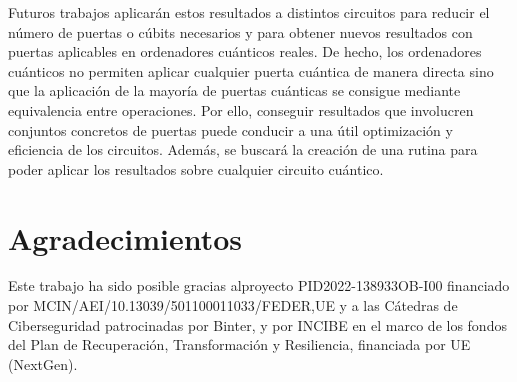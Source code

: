 \documentclass[10pt,conference,a4paper]{IEEEtran}
\begin{document}
Futuros trabajos  aplicarán estos resultados a distintos circuitos para reducir el número de puertas o cúbits necesarios y para obtener nuevos resultados con puertas aplicables en   ordenadores cuánticos reales. De hecho, los ordenadores cuánticos no permiten aplicar cualquier puerta cuántica de manera directa sino que la aplicación de la mayoría de puertas cuánticas se consigue mediante equivalencia entre operaciones. Por ello, conseguir resultados que involucren conjuntos concretos de puertas puede  conducir a una útil optimización y eficiencia de los circuitos. Además, se buscará la creación de una rutina para poder aplicar los resultados sobre cualquier circuito cuántico.

\section*{Agradecimientos}

Este trabajo ha sido posible gracias alproyecto PID2022-138933OB-I00 financiado  por MCIN/AEI/10.13039/501100011033/FEDER,UE y a las Cátedras  de Ciberseguridad  patrocinadas por Binter, y por INCIBE en el marco de los fondos del Plan de Recuperación, Transformación y Resiliencia, financiada por UE (NextGen). \\




\end{document}
